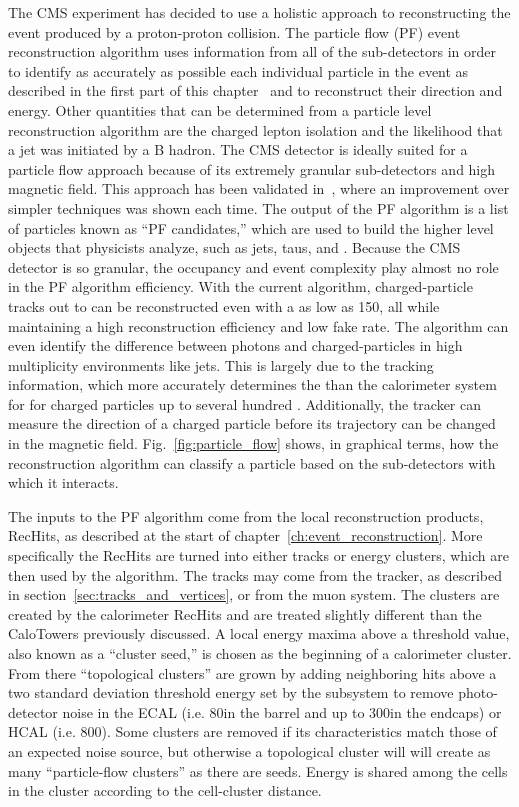 The CMS experiment has decided to use a holistic approach to reconstructing the event produced by a proton-proton collision.
The particle flow (PF) event reconstruction algorithm uses information from all of the sub-detectors in order to identify as accurately as possible each individual particle in the event as described in the first part of this chapter~\cite{CMS-PAS-PFT-09-001,CMS-PAS-PFT-10-001} and to reconstruct their direction and energy.
Other quantities that can be determined from a particle level reconstruction algorithm are the charged lepton isolation and the likelihood that a jet was initiated by a B hadron.
The CMS detector is ideally suited for a particle flow approach because of its extremely granular sub-detectors and high magnetic field.
This approach has been validated in~\cite{CMS-PAS-PFT-10-002,CMS-PAS-PFT-10-003,Beaudette:2014cea,CMS-PRF-14-001}, where an improvement over simpler techniques was shown each time.
The output of the PF algorithm is a list of particles known as ``PF candidates,'' which are used to build the higher level objects that physicists analyze, such as jets, taus, and \ETmiss.
Because the CMS detector is so granular, the occupancy and event complexity play almost no role in the PF algorithm efficiency.
With the current algorithm, charged-particle tracks out to  can be reconstructed even with a \pt as low as 150\mev, all while maintaining a high reconstruction efficiency and low fake rate.
The algorithm can even identify the difference between photons and charged-particles in high multiplicity environments like jets.
This is largely due to the tracking information, which more accurately determines the \pt than the calorimeter system for for charged particles up to several hundred \gev.
Additionally, the tracker can measure the direction of a charged particle before its trajectory can be changed in the magnetic field.
Fig.~\ref{fig:particle_flow} shows, in graphical terms, how the reconstruction algorithm can classify a particle based on the sub-detectors with which it interacts.

The inputs to the PF algorithm come from the local reconstruction products, RecHits, as described at the start of chapter~\ref{ch:event_reconstruction}.
More specifically the RecHits are turned into either tracks or energy clusters, which are then used by the algorithm.
The tracks may come from the tracker, as described in section~\ref{sec:tracks_and_vertices}, or from the muon system.
The clusters are created by the calorimeter RecHits and are treated slightly different than the CaloTowers previously discussed.
A local energy maxima above a threshold value, also known as a ``cluster seed,'' is chosen as the beginning of a calorimeter cluster.
From there ``topological clusters'' are grown by adding neighboring hits above a two standard deviation threshold energy set by the subsystem to remove photo-detector noise in the ECAL (i.e. 80\mev in the barrel and up to 300\mev in the endcaps) or HCAL (i.e. 800\mev).
Some clusters are removed if its characteristics match those of an expected noise source, but otherwise a topological cluster will will create as many ``particle-flow clusters'' as there are seeds.
Energy is shared among the cells in the cluster according to the cell-cluster distance.

